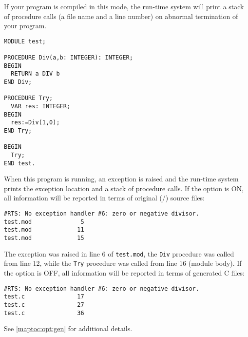 If your program is compiled in this mode, the run-time system will
print a stack of procedure calls (a file name and a line number) on
abnormal termination of your program.

\Example
\begin{verbatim}
MODULE test;

PROCEDURE Div(a,b: INTEGER): INTEGER;
BEGIN
  RETURN a DIV b
END Div;

PROCEDURE Try;
  VAR res: INTEGER;
BEGIN
  res:=Div(1,0);
END Try;

BEGIN
  Try;
END test.
\end{verbatim}
When this program is running, an exception is raised and the
run-time system prints the exception location and a stack of
procedure calls. If the option  is ON, all information
will be reported in terms of original (\ot{}/\mt{}) source files:
\begin{verbatim}
#RTS: No exception handler #6: zero or negative divisor.
test.mod              5
test.mod             11
test.mod             15
\end{verbatim}
The exception was raised in line 6 of {\tt test.mod},
the {\tt Div} procedure was called from line 12,
while the {\tt Try} procedure was called from line 16
(module body).
If the option  is OFF, all information will be reported in
terms of generated C files:
\begin{verbatim}
#RTS: No exception handler #6: zero or negative divisor.
test.c               17
test.c               27
test.c               36
\end{verbatim}
See \ref{maptoc:opt:gen} for additional details.

\fi %


